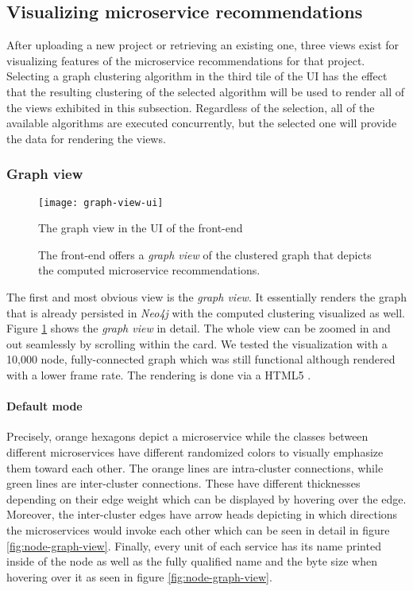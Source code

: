 \documentclass[12pt,a4paper]{report}
\begin{document}
\subsection{Visualizing microservice recommendations}

After uploading a new project or retrieving an existing one, three views exist
for visualizing features of the microservice recommendations for that project.
Selecting a graph clustering algorithm in the third tile of the UI
has the effect that the resulting clustering of the selected algorithm
will be used to render all of the views exhibited in this subsection.
Regardless of the selection, all of the available algorithms are executed
concurrently, but the selected one will provide the data for rendering the views.


\subsubsection{Graph view}
\begin{figure}[htbp]
\centering
\texttt{[image: graph-view-ui]}
\caption{The graph view in the UI of the front-end}
\caption*{\centering
  The front-end offers a \textit{graph view} of the clustered graph that depicts
  the computed microservice recommendations.
}
\label{fig:graph-view-ui}
\end{figure}

The first and most obvious view is the \textit{graph view}. It essentially
renders the graph that is already persisted in \textit{Neo4j} with the
computed clustering visualized as well. Figure \ref{fig:graph-view-ui} shows
the \textit{graph view} in detail. The whole view can be zoomed in and out
seamlessly by scrolling within the card. We tested the visualization with
a 10,000 node, fully-connected graph which was still functional although
rendered with a lower frame rate. The rendering is done via a HTML5 .

\paragraph{Default mode}
Precisely, orange hexagons depict a microservice while the classes between
different microservices have different randomized colors to visually emphasize
them toward each other. The orange lines are intra-cluster connections,
while green lines are inter-cluster connections.
These have different thicknesses depending on their edge weight which can be
displayed by hovering over the edge. Moreover, the inter-cluster edges have
arrow heads depicting in which directions the microservices would invoke
each other which can be seen in detail in figure \ref{fig:node-graph-view}.
Finally, every unit of each service has its name printed inside of the node
as well as the fully qualified name and the byte size when hovering over it
as seen in figure \ref{fig:node-graph-view}.
\end{document}
